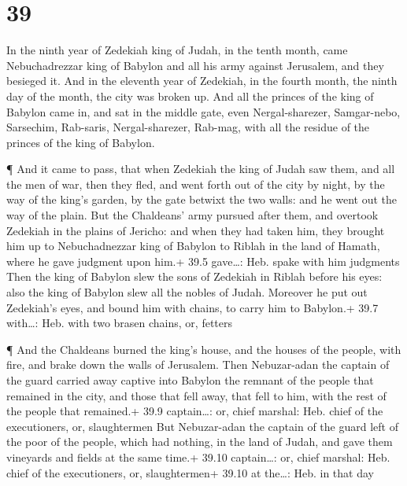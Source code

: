 \hypertarget{section-38}{%
\section{39}\label{section-38}}

 In the ninth year of Zedekiah king of Judah, in the tenth
month, came Nebuchadrezzar king of Babylon and all his army against
Jerusalem, and they besieged it.  And in the eleventh year
of Zedekiah, in the fourth month, the ninth day of the month, the city
was broken up.  And all the princes of the king of Babylon
came in, and sat in the middle gate, even Nergal-sharezer, Samgar-nebo,
Sarsechim, Rab-saris, Nergal-sharezer, Rab-mag, with all the residue of
the princes of the king of Babylon.

 ¶ And it came to pass, that when Zedekiah the king of Judah
saw them, and all the men of war, then they fled, and went forth out of
the city by night, by the way of the king's garden, by the gate betwixt
the two walls: and he went out the way of the plain.  But
the Chaldeans' army pursued after them, and overtook Zedekiah in the
plains of Jericho: and when they had taken him, they brought him up to
Nebuchadnezzar king of Babylon to Riblah in the land of Hamath, where he
gave judgment upon him.+ 39.5 gave\ldots: Heb. spake with him judgments
 Then the king of Babylon slew the sons of Zedekiah in
Riblah before his eyes: also the king of Babylon slew all the nobles of
Judah.  Moreover he put out Zedekiah's eyes, and bound him
with chains, to carry him to Babylon.+ 39.7 with\ldots: Heb. with two
brasen chains, or, fetters

 ¶ And the Chaldeans burned the king's house, and the houses
of the people, with fire, and brake down the walls of Jerusalem.
 Then Nebuzar-adan the captain of the guard carried away
captive into Babylon the remnant of the people that remained in the
city, and those that fell away, that fell to him, with the rest of the
people that remained.+ 39.9 captain\ldots: or, chief marshal: Heb. chief
of the executioners, or, slaughtermen  But Nebuzar-adan the
captain of the guard left of the poor of the people, which had nothing,
in the land of Judah, and gave them vineyards and fields at the same
time.+ 39.10 captain\ldots: or, chief marshal: Heb. chief of the
executioners, or, slaughtermen+ 39.10 at the\ldots: Heb. in that day


